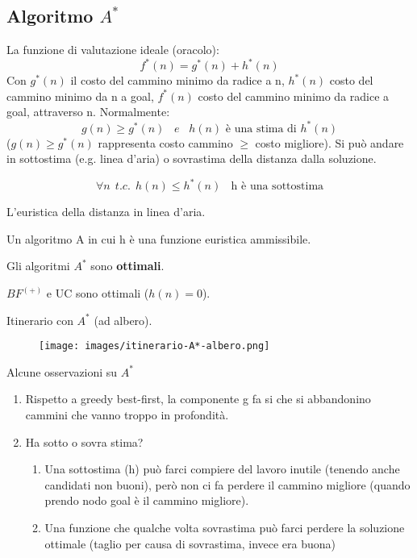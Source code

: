 \subsection{Algoritmo $A^*$}
La funzione di valutazione ideale (oracolo):
$$f^*(n) = g^*(n) + h^*(n)$$
Con $g^*(n)$ il costo del cammino minimo da radice a n, $h^*(n)$ costo del cammino minimo da n a goal, $f^*(n)$ costo
del cammino minimo da radice a goal, attraverso n. Normalmente:
$$g(n) \geq g^*(n) \hspace{10pt} e \hspace{10pt} h(n) \text{ è una stima di } h^*(n)$$
($g(n) \geq g^*(n)$ rappresenta costo cammino $\geq$ costo migliore). Si può andare in sottostima (e.g. linea d'aria) o 
sovrastima della distanza dalla soluzione.
\begin{definition}
    $$\forall n\:\: t.c.\:\: h(n) \leq h^*(n) \:\:\:\: \text{h è una sottostima}$$
\end{definition}
\begin{example}
    L'euristica della distanza in linea d'aria.
\end{example}
\begin{definition}[Algoritmo $A^*$]
    Un algoritmo A in cui h è una funzione euristica ammissibile.
\end{definition}
\begin{theorem}
    Gli algoritmi $A^*$ sono \textbf{ottimali}.
\end{theorem}
\begin{corollaries}
    $BF^{(+)}$ e UC sono ottimali ($h(n) = 0$).
\end{corollaries}
\begin{example}
    Itinerario con $A^*$ (ad albero).
    \begin{figure}[h!]
        \centering
        \texttt{[image: images/itinerario-A*-albero.png]}
    \end{figure}
\end{example}
\begin{observation}
    Alcune osservazioni su $A^*$
    \begin{enumerate}
        \item Rispetto a greedy best-first, la componente g fa si che si abbandonino cammini che vanno troppo in profondità.
        \item Ha sotto o sovra stima?
        \begin{enumerate}
            \item Una sottostima (h) può farci compiere del lavoro inutile (tenendo anche candidati non buoni), però non ci 
            fa perdere il cammino migliore (quando prendo nodo goal è il cammino migliore).
            \item Una funzione che qualche volta sovrastima può farci perdere la soluzione ottimale (taglio per causa di sovrastima, invece era buona)
        \end{enumerate}
    \end{enumerate}
\end{observation}

